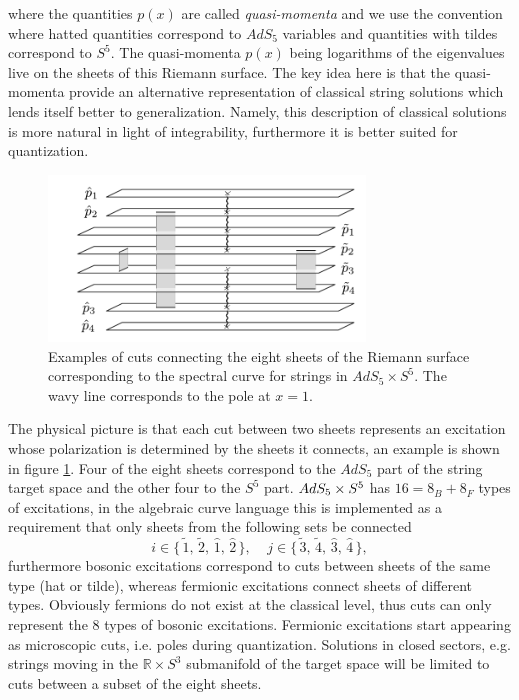 where the quantities $p(x)$ are called \emph{quasi-momenta} and we use the convention where hatted quantities correspond to $AdS_5$ variables and quantities with tildes correspond to $S^5$. 
The quasi-momenta $p(x)$ being logarithms of the eigenvalues live on the sheets of this Riemann surface.
The key idea here is that the quasi-momenta provide an alternative representation of classical string solutions which lends itself better to generalization. 
Namely, this description of classical solutions is more natural in light of integrability, furthermore it is better suited for quantization.

\begin{figure}[t]
	\centering
		\includegraphics[width=0.75\textwidth]{../graphics/cuts}
	\caption{Examples of cuts connecting the eight sheets of the Riemann surface corresponding to the spectral curve for strings in $AdS_5 \times S^5$. The wavy line corresponds to the pole at $x = 1$.}
	\label{fig:cuts}
\end{figure}

The physical picture is that each cut between two sheets represents an excitation whose polarization is determined by the sheets it connects, an example is shown in figure \ref{fig:cuts}. 
Four of the eight sheets correspond to the $AdS_5$ part of the string target space and the other four to the $S^5$ part. 
$AdS_5 \times S^5$ has $16 = 8_B + 8_F$ types of excitations, in the algebraic curve language this is implemented as a requirement that only sheets from the following sets be connected
\begin{equation}
	\label{eq:polarizations}
	i \in \{ \, \tilde{1}, \, \tilde{2}, \, \hat{1}, \, \hat{2} \, \}, \;\;\;\; j \in \{ \, \tilde{3}, \, \tilde{4}, \, \hat{3}, \, \hat{4} \, \},
\end{equation}
furthermore bosonic excitations correspond to cuts between sheets of the same type (hat or tilde), whereas fermionic excitations connect sheets of different types. 
Obviously fermions do not exist at the classical level, thus cuts can only represent the 8 types of bosonic excitations.
Fermionic excitations start appearing as microscopic cuts, i.e. poles during quantization. 
Solutions in closed sectors, e.g. strings moving in the $\mathbb{R} \times S^3$ submanifold of the target space will be limited to cuts between a subset of the eight sheets.

